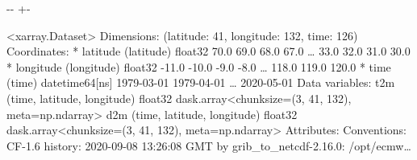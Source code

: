 \documentclass[letterpaper,10pt,english]{sphinxmanual}
\newlength\nbsphinxcodecellspacing
\begin{document}
{

\kern-\sphinxverbatimsmallskipamount\kern-\baselineskip
\kern+\FrameHeightAdjust\kern-\fboxrule
\vspace{\nbsphinxcodecellspacing}

\begin{sphinxVerbatim}[commandchars=\\\{\}]
\llap{\color{nbsphinxout}[12]:\,\hspace{\fboxrule}\hspace{\fboxsep}}<xarray.Dataset>
Dimensions:    (latitude: 41, longitude: 132, time: 126)
Coordinates:
  * latitude   (latitude) float32 70.0 69.0 68.0 67.0 {\ldots} 33.0 32.0 31.0 30.0
  * longitude  (longitude) float32 -11.0 -10.0 -9.0 -8.0 {\ldots} 118.0 119.0 120.0
  * time       (time) datetime64[ns] 1979-03-01 1979-04-01 {\ldots} 2020-05-01
Data variables:
    t2m        (time, latitude, longitude) float32 dask.array<chunksize=(3, 41, 132), meta=np.ndarray>
    d2m        (time, latitude, longitude) float32 dask.array<chunksize=(3, 41, 132), meta=np.ndarray>
Attributes:
    Conventions:  CF-1.6
    history:      2020-09-08 13:26:08 GMT by grib\_to\_netcdf-2.16.0: /opt/ecmw{\ldots}
\end{sphinxVerbatim}
}

{
\begin{sphinxVerbatim}[commandchars=\\\{\}]
\llap{\color{nbsphinxin}[13]:\,\hspace{\fboxrule}\hspace{\fboxsep}}   
\end{sphinxVerbatim}
}
\end{document}
